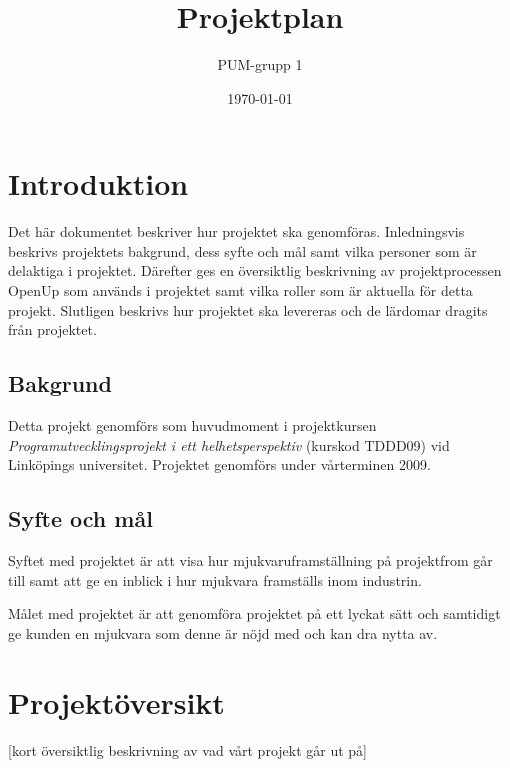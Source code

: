 

\ifpdf
\else
\fi

\title{Projektplan}
\author{PUM-grupp 1}
\date{\today}



\maketitle\thispagestyle{empty}

\newpage

\section{Introduktion}
Det här dokumentet beskriver hur projektet ska genomföras. Inledningsvis beskrivs projektets bakgrund, dess syfte och mål samt vilka personer som är delaktiga i projektet. Därefter ges en översiktlig beskrivning av projektprocessen OpenUp som används i projektet samt vilka roller som är aktuella för detta projekt. Slutligen beskrivs hur projektet ska levereras och de lärdomar dragits från projektet.

\subsection{Bakgrund}
Detta projekt genomförs som huvudmoment i projektkursen \textit{Programutvecklingsprojekt i ett helhetsperspektiv} (kurskod TDDD09) vid Linköpings universitet. Projektet genomförs under vårterminen 2009.

\subsection{Syfte och mål}
Syftet med projektet är att visa hur mjukvaruframställning på projektfrom går till samt att ge en inblick i hur mjukvara framställs inom industrin.

Målet med projektet är att genomföra projektet på ett lyckat sätt och samtidigt ge kunden en mjukvara som denne är nöjd med och kan dra nytta av.

\section{Projektöversikt}
[kort översiktlig beskrivning av vad vårt projekt går ut på]

